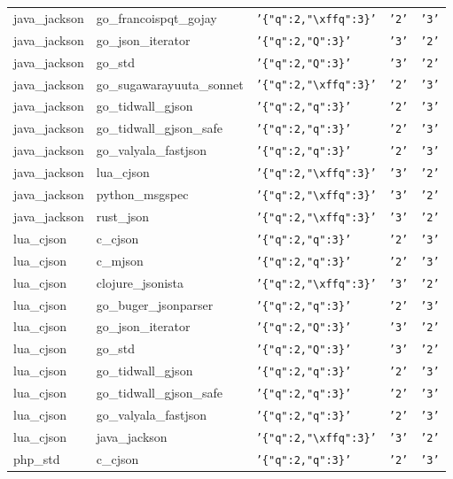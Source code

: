 \documentclass[english, 12pt, a4paper, sci, utf8, a-2b, online]{aaltothesis}
\def\str#1{\texttt{'#1'}}
\begin{document}
\begin{longtable}{lllll}
    java\_jackson & go\_francoispqt\_gojay & \str{\{"q":2,"\textbackslash xffq":3\}} & \str{2} & \str{3} \\
    java\_jackson & go\_json\_iterator & \str{\{"q":2,"Q":3\}} & \str{3} & \str{2} \\
    java\_jackson & go\_std & \str{\{"q":2,"Q":3\}} & \str{3} & \str{2} \\
    java\_jackson & go\_sugawarayuuta\_sonnet & \str{\{"q":2,"\textbackslash xffq":3\}} & \str{2} & \str{3} \\
    java\_jackson & go\_tidwall\_gjson & \str{\{"q":2,"q":3\}} & \str{2} & \str{3} \\
    java\_jackson & go\_tidwall\_gjson\_safe & \str{\{"q":2,"q":3\}} & \str{2} & \str{3} \\
    java\_jackson & go\_valyala\_fastjson & \str{\{"q":2,"q":3\}} & \str{2} & \str{3} \\
    java\_jackson & lua\_cjson & \str{\{"q":2,"\textbackslash xffq":3\}} & \str{3} & \str{2} \\
    java\_jackson & python\_msgspec & \str{\{"q":2,"\textbackslash xffq":3\}} & \str{3} & \str{2} \\
    java\_jackson & rust\_json & \str{\{"q":2,"\textbackslash xffq":3\}} & \str{3} & \str{2} \\
    lua\_cjson & c\_cjson & \str{\{"q":2,"q":3\}} & \str{2} & \str{3} \\
    lua\_cjson & c\_mjson & \str{\{"q":2,"q":3\}} & \str{2} & \str{3} \\
    lua\_cjson & clojure\_jsonista & \str{\{"q":2,"\textbackslash xffq":3\}} & \str{3} & \str{2} \\
    lua\_cjson & go\_buger\_jsonparser & \str{\{"q":2,"q":3\}} & \str{2} & \str{3} \\
    lua\_cjson & go\_json\_iterator & \str{\{"q":2,"Q":3\}} & \str{3} & \str{2} \\
    lua\_cjson & go\_std & \str{\{"q":2,"Q":3\}} & \str{3} & \str{2} \\
    lua\_cjson & go\_tidwall\_gjson & \str{\{"q":2,"q":3\}} & \str{2} & \str{3} \\
    lua\_cjson & go\_tidwall\_gjson\_safe & \str{\{"q":2,"q":3\}} & \str{2} & \str{3} \\
    lua\_cjson & go\_valyala\_fastjson & \str{\{"q":2,"q":3\}} & \str{2} & \str{3} \\
    lua\_cjson & java\_jackson & \str{\{"q":2,"\textbackslash xffq":3\}} & \str{3} & \str{2} \\
    php\_std & c\_cjson & \str{\{"q":2,"q":3\}} & \str{2} & \str{3} \\

\end{longtable}
\end{document}
